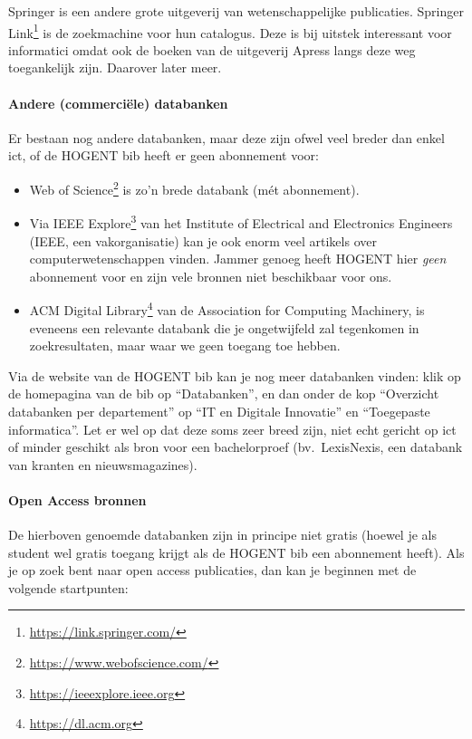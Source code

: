 Springer is een andere grote uitgeverij van wetenschappelijke publicaties. Springer Link\footnote{\url{https://link.springer.com/}} is de zoekmachine voor hun catalogus. Deze is bij uitstek interessant voor informatici omdat ook de boeken van de uitgeverij Apress langs deze weg toegankelijk zijn. Daarover later meer.

\paragraph{Andere (commerciële) databanken}

Er bestaan nog andere databanken, maar deze zijn ofwel veel breder dan enkel ict, of de HOGENT bib heeft er geen abonnement voor:

\begin{itemize}
  \item Web of Science\footnote{\url{https://www.webofscience.com/}} is zo'n brede databank (mét abonnement).
  \item Via IEEE Explore\footnote{\url{https://ieeexplore.ieee.org}} van het Institute of Electrical and Electronics Engineers (IEEE, een vakorganisatie) kan je ook enorm veel artikels over computerwetenschappen vinden. Jammer genoeg heeft HOGENT hier \textit{geen} abonnement voor en zijn vele bronnen niet beschikbaar voor ons.
  \item ACM Digital Library\footnote{\url{https://dl.acm.org}} van de Association for Computing Machinery, is eveneens een relevante databank die je ongetwijfeld zal tegenkomen in zoekresultaten, maar waar we geen toegang toe hebben.
\end{itemize}

Via de website van de HOGENT bib kan je nog meer databanken vinden: klik op de homepagina van de bib op ``Databanken'', en dan onder de kop ``Overzicht databanken per departement'' op ``IT en Digitale Innovatie'' en ``Toegepaste informatica''. Let er wel op dat deze soms zeer breed zijn, niet echt gericht op ict of minder geschikt als bron voor een bachelorproef (bv.\ LexisNexis, een databank van kranten en nieuwsmagazines).

\paragraph{Open Access bronnen}

De hierboven genoemde databanken zijn in principe niet gratis (hoewel je als student wel gratis toegang krijgt als de HOGENT bib een abonnement heeft). Als je op zoek bent naar open access publicaties, dan kan je beginnen met de volgende startpunten:

